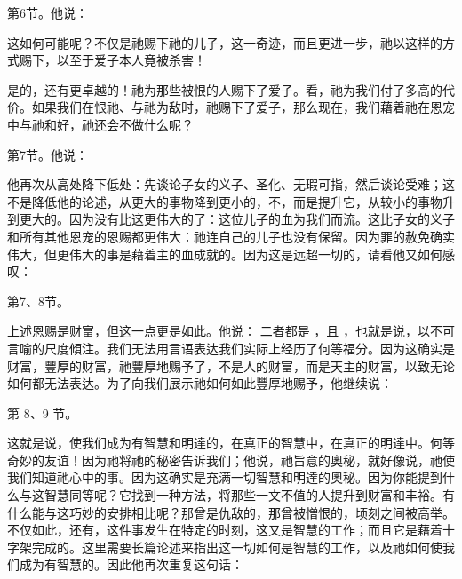 第6节。他说：\par

这如何可能呢？不仅是祂赐下祂的儿子，这一奇迹，而且更进一步，祂以这样的方式赐下，以至于爱子本人竟被杀害！\par

是的，还有更卓越的！祂为那些被恨的人赐下了爱子。看，祂为我们付了多高的代价。如果我们在恨祂、与祂为敌时，祂赐下了爱子，那么现在，我们藉着祂在恩宠中与祂和好，祂还会不做什么呢？\par

第7节。他说：\par

他再次从高处降下低处：先谈论子女的义子、圣化、无瑕可指，然后谈论受难；这不是降低他的论述，从更大的事物降到更小的，不，而是提升它，从较小的事物升到更大的。因为没有比这更伟大的了：这位儿子的血为我们而流。这比子女的义子和所有其他恩宠的恩赐都更伟大：祂连自己的儿子也没有保留。因为罪的赦免确实伟大，但更伟大的事是藉着主的血成就的。因为这是远超一切的，请看他又如何感叹：\par

第7、8节。\par

上述恩赐是财富，但这一点更是如此。他说： 二者都是 ，且 ，也就是说，以不可言喻的尺度傾注。我们无法用言语表达我们实际上经历了何等福分。因为这确实是财富，豐厚的财富，祂豐厚地赐予了，不是人的财富，而是天主的财富，以致无论如何都无法表达。为了向我们展示祂如何如此豐厚地赐予，他继续说：\par

第 8、9 节。\par

这就是说，使我们成为有智慧和明達的，在真正的智慧中，在真正的明達中。何等奇妙的友谊！因为祂将祂的秘密告诉我们；他说，祂旨意的奧秘，就好像说，祂使我们知道祂心中的事。因为这确实是充满一切智慧和明達的奧秘。因为你能提到什么与这智慧同等呢？它找到一种方法，将那些一文不值的人提升到财富和丰裕。有什么能与这巧妙的安排相比呢？那曾是仇敌的，那曾被憎恨的，顷刻之间被高举。不仅如此，还有，这件事发生在特定的时刻，这又是智慧的工作；而且它是藉着十字架完成的。这里需要长篇论述来指出这一切如何是智慧的工作，以及祂如何使我们成为有智慧的。因此他再次重复这句话：\par

\par

